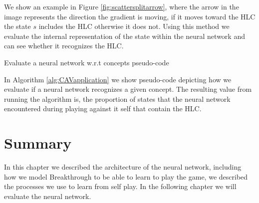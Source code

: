 We show an example in Figure \ref{fig:scattersplitarrow}, where the arrow in the image represents the direction the gradient is moving, if it moves toward the HLC the state $s$ includes the HLC otherwise it does not. Using this method we evaluate the internal representation of the state within the neural network and can see whether it recognizes the HLC.

\begin{algorithm}[t]
    \caption{Evaluate a neural network w.r.t concepts pseudo-code}
    \label{alg:CAVapplication}
    \begin{algorithmic}[1]
        \ENDIF
        \ENDWHILE
        \ENDFOR
    \end{algorithmic}
\end{algorithm}

In Algorithm \ref{alg:CAVapplication} we show pseudo-code depicting how we evaluate if a neural network recognizes a given concept. The resulting value from running the algorithm is, the proportion of states that the neural network encountered during playing against it self that contain the HLC.


\section{Summary}

In this chapter we described the architecture of the neural network, including how we model Breakthrough to be able to learn to play the game, we described the processes we use to learn from self play. In the following chapter we will evaluate the neural network.

